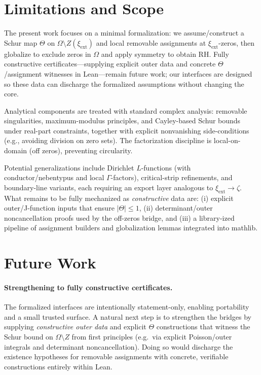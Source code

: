 \documentclass[11pt]{article}
\theoremstyle{plain}
\theoremstyle{definition}
\begin{document}
\section{Limitations and Scope}
The present work focuses on a minimal formalization: we assume/construct a Schur map \(\Theta\) on \(\Omega\setminus Z(\xi_{\mathrm{ext}})\) and local removable assignments at \(\xi_{\mathrm{ext}}\)-zeros, then globalize to exclude zeros in \(\Omega\) and apply symmetry to obtain RH. Fully constructive certificates—supplying explicit outer data and concrete \(\Theta\)/assignment witnesses in Lean—remain future work; our interfaces are designed so these data can discharge the formalized assumptions without changing the core.

Analytical components are treated with standard complex analysis: removable singularities, maximum-modulus principles, and Cayley-based Schur bounds under real-part constraints, together with explicit nonvanishing side-conditions (e.g., avoiding division on zero sets). The factorization discipline is local-on-domain (off zeros), preventing circularity.

Potential generalizations include Dirichlet \(L\)-functions (with conductor/nebentypus and local \(\Gamma\)-factors), critical-strip refinements, and boundary-line variants, each requiring an export layer analogous to \(\xi_{\mathrm{ext}}\rightarrow\zeta\). What remains to be fully mechanized as \emph{constructive} data are: (i) explicit outer/J-function inputs that ensure \(|\Theta|\le 1\), (ii) determinant/outer noncancellation proofs used by the off-zeros bridge, and (iii) a library-ized pipeline of assignment builders and globalization lemmas integrated into mathlib.

\section{Future Work}
\label{sec:future}

\paragraph{Strengthening to fully constructive certificates.}
The formalized interfaces are intentionally statement-only, enabling portability and a small trusted surface. A natural next step is to strengthen the bridges by supplying \emph{constructive outer data} and explicit \(\Theta\) constructions that witness the Schur bound on \(\Omega\setminus Z\) from first principles (e.g.\ via explicit Poisson/outer integrals and determinant noncancellation). Doing so would discharge the existence hypotheses for removable assignments with concrete, verifiable constructions entirely within Lean.
\end{document}
